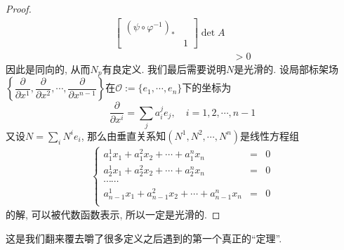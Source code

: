\begin{proof}
\begin{align*}
{            \begin{bmatrix}
                (\psi\circ\varphi^{-1})_* & \\
                & 1
            \end{bmatrix}
        }\det{A}\\
        &>0
    \end{align*}
    因此是同向的, 从而$N_p$有良定义.
    我们最后需要说明$N$是光滑的.
    设局部标架场$\left\{\dfrac{\partial}{\partial x^1},\dfrac{\partial}{\partial x^2},\cdots,\dfrac{\partial}{\partial x^{n-1}}\right\}$在$\mathcal{O}:=\{e_1,\cdots,e_n\}$下的坐标为
    \[\frac{\partial}{\partial x^i}=\sum_{j}a^j_ie_j,\quad i=1,2,\cdots,n-1\]
    又设$\displaystyle N=\sum_{i}N^ie_i$, 那么由垂直关系知$(N^1,N^2,\cdots,N^n)$是线性方程组
    \begin{align*}
        \left\{\begin{array}{ccc}
            a^1_1x_1+a^2_1x_2+\cdots+a^n_1x_n & = & 0\\
            a^1_2x_1+a^2_2x_2+\cdots+a^n_2x_n & = & 0\\
            \cdots\cdots & & \\
            a^1_{n-1}x_1+a^2_{n-1}x_2+\cdots+a^n_{n-1}x_n & = & 0\\
        \end{array}\right.
    \end{align*}
    的解, 可以被代数函数表示, 所以一定是光滑的.
\end{proof} %

这是我们翻来覆去嚼了很多定义之后遇到的第一个真正的``定理''.

